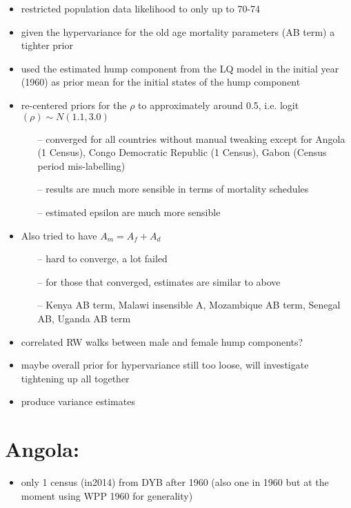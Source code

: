 \documentclass[12pt,a4paper]{article}
\date{\vspace{-5ex}}
\begin{document}
\begin{itemize}
\item restricted population data likelihood to only up to 70-74
\item given the hypervariance for the old age mortality parameters (AB term) a tighter prior
\item used the estimated hump component from the LQ model in the initial year (1960) as prior mean for the initial states of the hump component
\item re-centered priors for the $\rho$ to approximately around 0.5, i.e. logit$(\rho) \sim N(1.1, 3.0)$
	\begin{itemize}
	\item[--] converged for all countries without manual tweaking except for Angola (1 Census), Congo Democratic Republic (1 Census), Gabon (Census period mis-labelling)
	\item[--] results are much more sensible in terms of mortality schedules
	\item[--] estimated epsilon are much more sensible
	\end{itemize}

\item Also tried to have $A_m = A_f + A_d$
	\begin{itemize}
	\item[--] hard to converge, a lot failed
	\item[--] for those that converged, estimates are similar to above
	\item[--] Kenya AB term, Malawi insensible A, Mozambique AB term, Senegal AB, Uganda AB term
	\end{itemize}

\item correlated RW walks between male and female hump components?
\item maybe overall prior for hypervariance still too loose, will investigate tightening up all together
\item produce variance estimates
\end{itemize}

\section*{Angola:}
\begin{itemize}
\item only 1 census (in2014) from DYB after 1960 (also one in 1960 but at the moment using WPP 1960 for generality)
\end{itemize}
\end{document}
